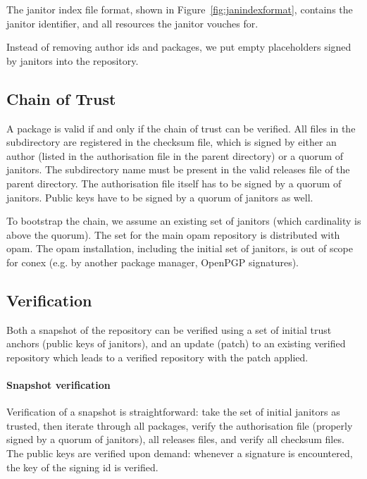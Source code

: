 \documentclass[nocopyrightspace]{sigplanconf}
\begin{document}
The janitor index file format, shown in Figure~\ref{fig:janindexformat}, contains the janitor identifier, and all resources the janitor vouches for.

Instead of removing author ids and packages, we put empty placeholders signed by janitors into the repository.

\subsection{Chain of Trust}
A package is valid if and only if the chain of trust can be verified.
All files in the subdirectory are registered in the checksum file, which is signed by either an author (listed in the authorisation file in the parent directory) or a quorum of janitors.
The subdirectory name must be present in the valid releases file of the parent directory.
The authorisation file itself has to be signed by a quorum of janitors.
Public keys have to be signed by a quorum of janitors as well.

To bootstrap the chain, we assume an existing set of janitors (which cardinality is above the quorum).
The set for the main opam repository is distributed with opam.
The opam installation, including the initial set of janitors, is out of scope for conex (e.g. by another package manager, OpenPGP signatures).

\subsection{Verification}
Both a snapshot of the repository can be verified using a set of initial trust anchors (public keys of janitors), and an update (patch) to an existing verified repository which leads to a verified repository with the patch applied.

\paragraph{Snapshot verification}  Verification of a snapshot is straightforward: take the set of initial janitors as trusted, then iterate through all packages, verify the authorisation file (properly signed by a quorum of janitors), all releases files, and verify all checksum files.
The public keys are verified upon demand: whenever a signature is encountered, the key of the signing id is verified.
\end{document}
